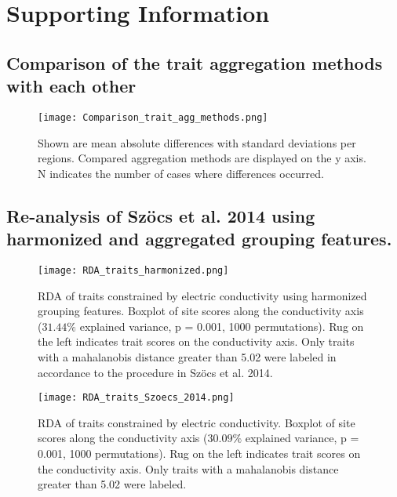 \documentclass[../Draft_harmonization_paper.tex]{subfiles}
\begin{document}
\section*{Supporting Information}

\subsection*{Comparison of the trait aggregation methods with each other}

\begin{figure}[H]
    \centering
    \texttt{[image: Comparison\_trait\_agg\_methods.png]}
    \caption{Shown are mean absolute differences with standard deviations per regions. Compared aggregation methods are displayed on the y axis. N indicates the number of cases where differences occurred.}
\end{figure}


\newpage

\subsection*{Re-analysis of Szöcs et al. 2014 using harmonized and aggregated grouping features.}
\label{subsec:SI_szoecs_reanalysis}

\begin{figure}[H]
    \centering
    \texttt{[image: RDA\_traits\_harmonized.png]}
    \caption{RDA of traits constrained by electric conductivity using harmonized grouping features. Boxplot of site scores along the conductivity axis ($31.44 \%$ explained variance, p = 0.001, 1000 permutations). Rug on the left indicates trait scores on the conductivity axis. Only traits with a mahalanobis distance greater than 5.02 were labeled in accordance to the procedure in Szöcs et al. 2014.
    } 
\end{figure}

\begin{figure}[H]
    \centering
    \texttt{[image: RDA\_traits\_Szoecs\_2014.png]}
    \caption{RDA of traits constrained by electric conductivity. Boxplot of site scores along the conductivity axis ($30.09 \%$ explained variance, p = 0.001, 1000 permutations). Rug on the left indicates trait scores on the conductivity axis. Only traits with a mahalanobis distance greater than 5.02 were labeled.
    } 
\end{figure}
\end{document}
